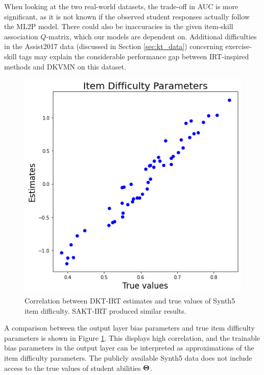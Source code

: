 When looking at the two real-world datasets, the trade-off in AUC is more significant, as it is not known if the observed student responses actually follow the ML2P model. There could also be inaccuracies in the given item-skill association $Q$-matrix, which our models are dependent on. Additional difficulties in the Assist2017 data (discussed in Section \ref{sec:kt_data}) concerning exercise-skill tags may explain the considerable performance gap between IRT-inspired methods and DKVMN on this dataset.

\begin{figure}[h]
  \centering
  \includegraphics[width=.5\textwidth]{img/kt_irt/synth5_diff_est_lstm.png}
  \caption{Correlation between DKT-IRT estimates and true values of Synth5 item difficulty. SAKT-IRT produced similar results.}
  \label{fig:synth5_diff}
\end{figure}

A comparison between the output layer bias parameters and true item difficulty parameters is shown in Figure \ref{fig:synth5_diff}. This displays high correlation, and the trainable bias parameters in the output layer can be interpreted as approximations of the item difficulty parameters. The publicly available Synth5 data does not include access to the true values of student abilities $\boldsymbol{\Theta}$.

